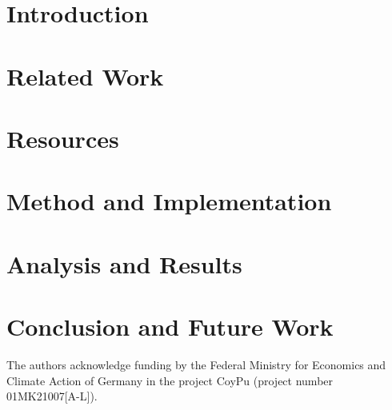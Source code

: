 \documentclass[
]{ceurart}
\begin{document}
\maketitle

\section{Introduction}\label{sec:intro}


\section{Related Work}\label{sec:rel_work}


\section{Resources}\label{sec:resources}


\section{Method and Implementation}\label{sec:method}


\section{Analysis and Results}\label{sec:experiments}


\section{Conclusion and Future Work}\label{sec:conclusion}


\begin{acknowledgments}
The authors acknowledge funding by the Federal Ministry for Economics and Climate Action of Germany in the project CoyPu (project number 01MK21007[A-L]).
\end{acknowledgments}


\end{document}
